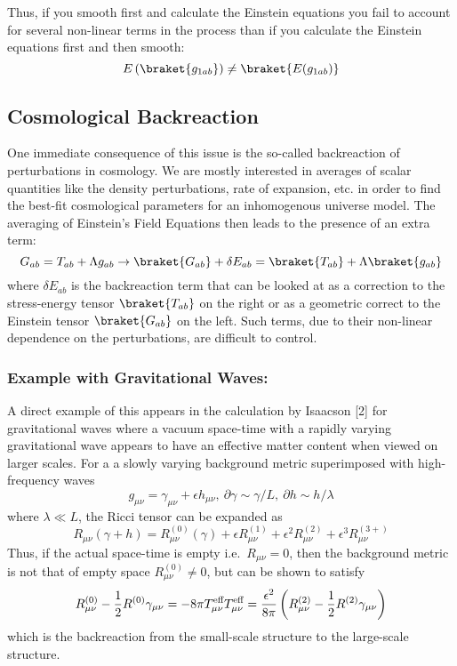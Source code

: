 Thus, if you smooth first and calculate the Einstein equations you fail
to account for several non-linear terms in the process than if you
calculate the Einstein equations first and then smooth:
\[E\left(\braket{g_{1ab}}\right) \neq \braket{E(g_{1ab})}\]

\hypertarget{cosmological-backreaction}{%
\subsection{Cosmological Backreaction}\label{cosmological-backreaction}}

One immediate consequence of this issue is the so-called backreaction of
perturbations in cosmology. We are mostly interested in averages of
scalar quantities like the density perturbations, rate of expansion,
etc. in order to find the best-fit cosmological parameters for an
inhomogenous universe model. The averaging of Einstein's Field Equations
then leads to the presence of an extra term:
\[ G_{ab} = T_{ab} + \Lambda g_{ab} \rightarrow \braket{G_{ab}} + \delta E_{ab} = \braket{T_{ab}} + \Lambda \braket{g_{ab}}\]
where \(\delta E_{ab}\) is the backreaction term that can be looked at
as a correction to the stress-energy tensor \(\braket{T_{ab}}\) on the
right or as a geometric correct to the Einstein tensor
\(\braket{G_{ab}}\) on the left. Such terms, due to their non-linear
dependence on the perturbations, are difficult to control.

\hypertarget{example-with-gravitational-waves}{%
\subsubsection{Example with Gravitational
Waves:}\label{example-with-gravitational-waves}}

A direct example of this appears in the calculation by Isaacson {[}2{]}
for gravitational waves where a vacuum space-time with a rapidly varying
gravitational wave appears to have an effective matter content when
viewed on larger scales. For a a slowly varying background metric
superimposed with high-frequency waves
\[g_{\mu\nu} = \gamma_{\mu\nu} + \epsilon h_{\mu\nu}, \ \partial\gamma\sim\gamma/L, \ \partial h\sim h/\lambda\]
where \(\lambda\ll L\), the Ricci tensor can be expanded as
\[R_{\mu\nu}(\gamma+h) = R^{(0)}_{\mu\nu}(\gamma) + \epsilon R^{(1)}_{\mu\nu} + \epsilon^2 R^{(2)}_{\mu\nu} + \epsilon^3 R^{(3+)}_{\mu\nu}\]
Thus, if the actual space-time is empty i.e.~\(R_{\mu\nu}=0\), then the
background metric is not that of empty space \(R^{(0)}_{\mu\nu}\neq 0\),
but can be shown to satisfy
\[ R^{(0)}_{\mu\nu} - \frac{1}{2}R^{(0)}\gamma_{\mu\nu} = -8\pi T^{\text{eff}}_{\mu\nu} \\ T^{\text{eff}}_{\mu\nu} = \frac{\epsilon^2}{8\pi}\left( R^{(2)}_{\mu\nu} - \frac{1}{2}R^{(2)}\gamma_{\mu\nu} \right)\]
which is the backreaction from the small-scale structure to the
large-scale structure.


